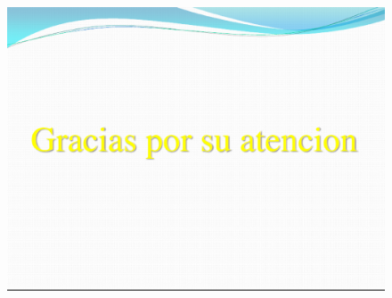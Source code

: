 \documentclass{beamer}
\begin{document}
\begin{frame}
\frametitle{ }
\begin{figure}[!th]
\begin{center}
\includegraphics[width=1\textwidth]{img/pic16.eps}
\end{center}
\end{figure}
\end{frame}


\end{document}
